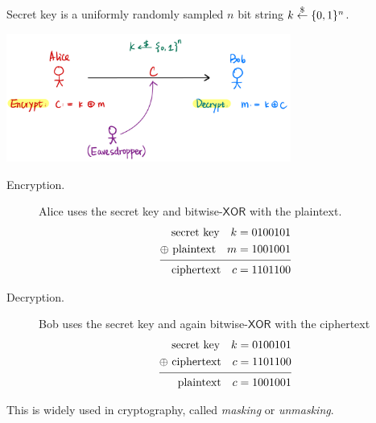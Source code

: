 \begin{definition}
    Secret key is a uniformly randomly sampled $n$ bit string $k\overset{\$}{\leftarrow} \{0, 1\}^n$.

    \begin{center}
        \includegraphics[width=0.7\textwidth]{images/2023-01-31/otp-defn.png}
    \end{center}

    \begin{description}
        \item[Encryption.] Alice uses the secret key and bitwise-$\mathsf{XOR}$ with the plaintext.
            \begin{align*}
                \begin{split}
                    \text{secret key}\quad k       & = 0100101 \\
                    \oplus\text{ plaintext}\quad m & = 1001001 \\ \eqline
                    \text{ciphertext}\quad c       & = 1101100
                \end{split}
            \end{align*}
        \item[Decryption.] Bob uses the secret key and again bitwise-$\mathsf{XOR}$ with the ciphertext
            \begin{align*}
                \begin{split}
                    \text{secret key}\quad k        & = 0100101 \\
                    \oplus\text{ ciphertext}\quad c & = 1101100 \\ \eqline
                    \text{plaintext}\quad c         & = 1001001
                \end{split}
            \end{align*}
    \end{description}

    This is widely used in cryptography, called \emph{masking} or \emph{unmasking}.
\end{definition}

